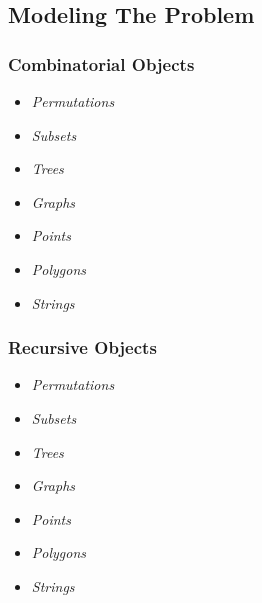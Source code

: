 \subsection{Modeling The Problem}

\subsubsection{Combinatorial Objects}

\begin{itemize}
\itemsep1pt\parskip0pt
\item
  \emph{Permutations}
\item
  \emph{Subsets}
\item
  \emph{Trees}
\item
  \emph{Graphs}
\item
  \emph{Points}
\item
  \emph{Polygons}
\item
  \emph{Strings}
\end{itemize}

\noindent{}

\subsubsection{Recursive Objects}

\begin{itemize}
\itemsep1pt\parskip0pt
\item
  \emph{Permutations}
\item
  \emph{Subsets}
\item
  \emph{Trees}
\item
  \emph{Graphs}
\item
  \emph{Points}
\item
  \emph{Polygons}
\item
  \emph{Strings}
\end{itemize}